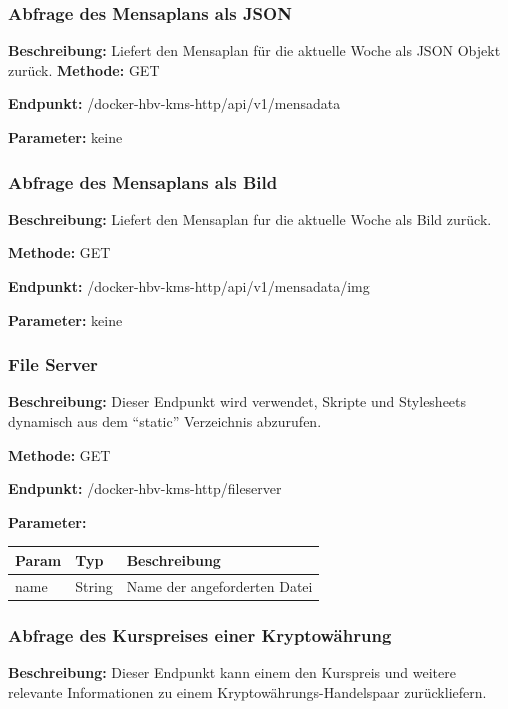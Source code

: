 \subsubsection{Abfrage des Mensaplans als JSON}
\label{sec:api-mensa-json}
\textbf{Beschreibung:} Liefert den Mensaplan für die aktuelle Woche als JSON Objekt zurück.
\textbf{Methode:} GET

\textbf{Endpunkt:} /docker-hbv-kms-http/api/v1/mensadata

\textbf{Parameter:} keine

\dotfill

\subsubsection{Abfrage des Mensaplans als Bild}
\label{sec:api-mensa-img}
\textbf{Beschreibung:} Liefert den Mensaplan fur die aktuelle Woche als Bild zurück.

\textbf{Methode:} GET

\textbf{Endpunkt:} /docker-hbv-kms-http/api/v1/mensadata/img

\textbf{Parameter:} keine

\dotfill

\subsubsection{File Server}
\label{sec:api-fileserver}
\textbf{Beschreibung:} Dieser Endpunkt wird verwendet, Skripte und Stylesheets dynamisch aus dem ``static'' Verzeichnis
abzurufen.

\textbf{Methode:} GET

\textbf{Endpunkt:} /docker-hbv-kms-http/fileserver

\textbf{Parameter:}
\begin{table}[H]
    \label{table:/docker-hbv-kms-http/fileserver}
    \setlength{\tabcolsep}{3pt}
    \begin{tabular}{p{100pt}p{80pt}p{200pt}}
        \hline
        Param & Typ    & Beschreibung                 \\
        \hline
        name  & String & Name der angeforderten Datei \\
        \hline
    \end{tabular}
\end{table}
\dotfill


\subsubsection{Abfrage des Kurspreises einer Kryptowährung}
\label{sec:api-crypto}
\textbf{Beschreibung:} Dieser Endpunkt kann einem den Kurspreis und weitere relevante Informationen zu einem
Kryptowährungs-Handelspaar zurückliefern.


